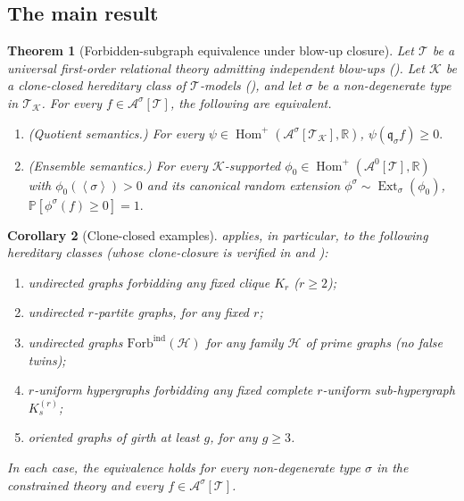 \documentclass[11pt]{article}
\newtheorem{theorem}{Theorem}
\newtheorem{corollary}[theorem]{Corollary}
\theoremstyle{definition}
\newcommand{\R}{\mathbb{R}}
\newcommand{\Prob}{\mathbb{P}}
\newcommand{\A}{\mathcal{A}}
\newcommand{\K}{\mathcal{K}}
\newcommand{\T}{\mathcal{T}}
\newcommand{\Homp}{\operatorname{Hom}^{+}}
\newcommand{\Ext}{\operatorname{Ext}}
\newcommand{\brak}[1]{\left\langle #1\right\rangle}
\newcommand{\q}{\mathfrak{q}}
\begin{document}
\subsection{The main result}

\begin{theorem}[Forbidden-subgraph equivalence under blow-up closure]\label{thm:main}
Let $\T$ be a universal first-order relational theory admitting
independent blow-ups ().  Let $\K$ be a clone-closed
hereditary class of $\T$-models (), and let
$\sigma$ be a non-degenerate type in $\T_\K$.  For every
$f\in\A^\sigma[\T]$, the following are equivalent.
\begin{enumerate}[label=\textup{(\alph*)}, leftmargin=2.5em]
  \item\label{item:quotient}\textup{(Quotient semantics.)}
  For every $\psi\in\Homp(\A^\sigma[\T_\K],\R)$,
  \(
     \psi(\q_\sigma f)\ge 0.
  \)
  \item\label{item:ensemble}\textup{(Ensemble semantics.)}
  For every $\K$-supported $\phi_0\in\Homp(\A^0[\T],\R)$ with
  $\phi_0(\brak\sigma)>0$ and its canonical random extension
  $\phi^\sigma\sim\Ext_\sigma(\phi_0)$,
  \(
     \Prob[\phi^\sigma(f)\ge 0]=1.
  \)
\end{enumerate}
\end{theorem}

\begin{corollary}[Clone-closed examples]\label{cor:cliques}
 applies, in particular, to the following hereditary
classes (whose clone-closure is verified in
 and ):
\begin{enumerate}[label=\textup{(\alph*)}, leftmargin=2.5em]
\item undirected graphs forbidding any fixed clique $K_r$ \textup{($r\ge 2$)};
\item undirected $r$-partite graphs, for any fixed $r$;
\item undirected graphs $\mathrm{Forb}^{\mathrm{ind}}(\mathcal H)$ for
any family $\mathcal H$ of prime graphs (no false twins);
\item $r$-uniform hypergraphs forbidding any fixed complete
$r$-uniform sub-hypergraph $K_s^{(r)}$;
\item oriented graphs of girth at least $g$, for any $g\ge 3$.
\end{enumerate}
In each case, the equivalence holds for every non-degenerate type
$\sigma$ in the constrained theory and every $f\in\A^\sigma[\T]$.
\end{corollary}
\end{document}
